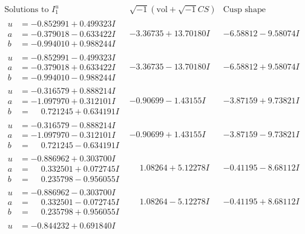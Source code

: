 \documentclass[1p]{elsarticle_modified}
\theoremstyle{definition}
\newcommand{\I}{\sqrt{-1}}
\begin{document}
$$\begin{array}{c|c|c}  
\text{Solutions to }I^u_{1}& \I (\text{vol} + \sqrt{-1}CS) & \text{Cusp shape}\\
 \hline 
\begin{aligned}
u &= -0.852991 + 0.499323 I \\
a &= -0.379018 - 0.633422 I \\
b &= -0.994010 + 0.988244 I\end{aligned}
 & -3.36735 + 13.70180 I & -6.58812 - 9.58074 I \\ \hline\begin{aligned}
u &= -0.852991 - 0.499323 I \\
a &= -0.379018 + 0.633422 I \\
b &= -0.994010 - 0.988244 I\end{aligned}
 & -3.36735 - 13.70180 I & -6.58812 + 9.58074 I \\ \hline\begin{aligned}
u &= -0.316579 + 0.888214 I \\
a &= -1.097970 + 0.312101 I \\
b &= \phantom{-}0.721245 + 0.634191 I\end{aligned}
 & -0.90699 - 1.43155 I & -3.87159 + 9.73821 I \\ \hline\begin{aligned}
u &= -0.316579 - 0.888214 I \\
a &= -1.097970 - 0.312101 I \\
b &= \phantom{-}0.721245 - 0.634191 I\end{aligned}
 & -0.90699 + 1.43155 I & -3.87159 - 9.73821 I \\ \hline\begin{aligned}
u &= -0.886962 + 0.303700 I \\
a &= \phantom{-}0.332501 + 0.072745 I \\
b &= \phantom{-}0.235798 - 0.956055 I\end{aligned}
 & \phantom{-}1.08264 + 5.12278 I & -0.41195 - 8.68112 I \\ \hline\begin{aligned}
u &= -0.886962 - 0.303700 I \\
a &= \phantom{-}0.332501 - 0.072745 I \\
b &= \phantom{-}0.235798 + 0.956055 I\end{aligned}
 & \phantom{-}1.08264 - 5.12278 I & -0.41195 + 8.68112 I \\ \hline\begin{aligned}
u &= -0.844232 + 0.691840 I \\

\end{aligned}
\end{array}$$
\end{document}
